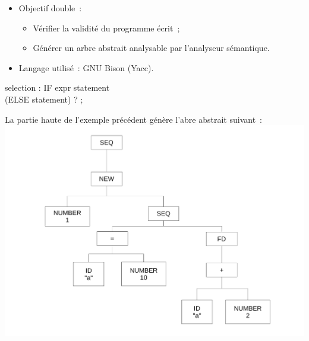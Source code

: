 \begin{frame}
	\begin{itemize}
	\item Objectif double~: 
		\begin{itemize}
		\item Vérifier la validité du programme écrit~;
		\item Générer un arbre abstrait analysable par l'analyseur sémantique.
		\end{itemize}
	\item Langage utilisé~: GNU Bison (Yacc).
	\end{itemize}
\end{frame}

\begin{frame}[fragile]
	\begin{rail}
		selection : IF expr statement \\ (ELSE statement) ? ;
	\end{rail}
\end{frame}

\begin{frame}
La partie haute de l'exemple précédent génère l'abre abstrait suivant~:
\includegraphics[scale=0.3]{doc/Presentation/img/arbre.pdf}
\end{frame}

